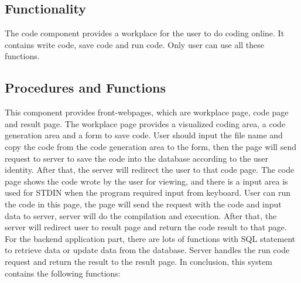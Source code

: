 \subsection{Functionality}
The code component provides a workplace for the user to do coding online. It contains write code, save code and run code. Only user can use all these functions. 

\subsection{Procedures and Functions}
This component provides front-webpages, which are workplace page, code page and result page.\newline\newline
The workplace page provides a visualized coding area, a code generation area and a form to save code. User should input the file name and copy the code from the code generation area to the form, then the page will send request to server to save the code into the database according to the user identity. After that, the server will redirect the user to that code page.\newline\newline
The code page shows the code wrote by the user for viewing, and there is a input area is used for STDIN when the program required input from keyboard. User can run the code in this page, the page will send the request with the code and input data to server, server will do the compilation and execution. After that, the server will redirect user to result page and return the code result to that page.\newline\newline
For the backend application part, there are lots of functions with SQL statement to retrieve data or update data from the database. Server handles the run code request and return the result to the result page.\newline\newline
In conclusion, this system contains the following functions:\newline

